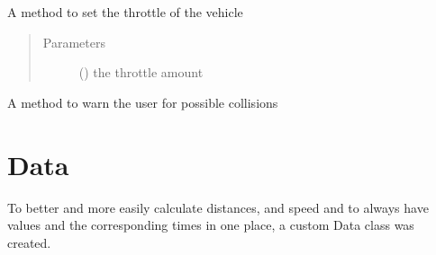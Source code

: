 \documentclass[letterpaper,10pt,english]{sphinxmanual}
\begin{document}
\begin{fulllineitems}
\begin{fulllineitems}
\begin{quote}
\begin{description}
\end{description}\end{quote}

\end{fulllineitems}


\begin{fulllineitems}
\label{\detokenize{driver:lib.driver.CanBus.set_throttle}}
A method to set the throttle of the vehicle
\begin{quote}\begin{description}
\item[{Parameters}] \leavevmode
{} () \textendash{} the throttle amount

\end{description}\end{quote}

\end{fulllineitems}


\begin{fulllineitems}
\label{\detokenize{driver:lib.driver.CanBus.warn}}
A method to warn the user for possible collisions

\end{fulllineitems}


\end{fulllineitems}


\ignorespaces 

\chapter{Data}
\label{\detokenize{data:data}}\label{\detokenize{data:index-0}}\label{\detokenize{data::doc}}
To better and more easily calculate distances, and speed and to always have values and the corresponding times in one
place, a custom Data class was created.
\end{document}
